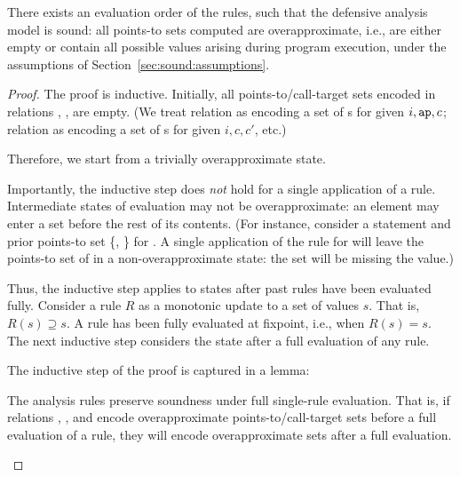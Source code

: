\begin{theorem}
There exists an evaluation order of the rules, such that the defensive analysis model is sound: all points-to sets computed are overapproximate, i.e., are either empty or contain all possible values arising during program execution, under the assumptions of Section~\ref{sec:sound:assumptions}.

\begin{proof}
The proof is inductive. Initially, all points-to/call-target sets encoded in relations \apinRAW{}, \apoutRAW{}, \calls{}{}{}{} are empty. (We treat relation  as encoding a set of s for given $i,\texttt{ap},c$; relation  as encoding a set of s for given $i, c, c'$, etc.)

Therefore, we start from a trivially overapproximate state.

Importantly, the inductive step does \emph{not} hold for a single application of a rule. Intermediate states of evaluation may not be overapproximate: an element may enter a set before the rest of its contents. (For instance, consider a statement  and prior points-to set \{, \} for . A single application of the  rule for  will leave the points-to set of  in a non-overapproximate state: the set will be missing the  value.)

Thus, the inductive step applies to states after past rules have been evaluated fully. Consider a rule $R$ as a monotonic update to a set of values $s$. That is, $R(s) \supseteq s$. A rule has been fully evaluated at fixpoint, i.e., when $R(s) = s$. The next inductive step considers the state after a full evaluation of any rule.

The inductive step of the proof is captured in a lemma:

\begin{lemma}
The analysis rules preserve soundness under full single-rule evaluation. That is, if relations \apinRAW{}, \apoutRAW{}, and \calls{}{}{}{} encode overapproximate points-to/call-target sets before a full evaluation of a rule, they will encode overapproximate sets after a full evaluation.
\label{lemma:sound:rule}
\end{lemma}


\end{proof}
\end{theorem}
